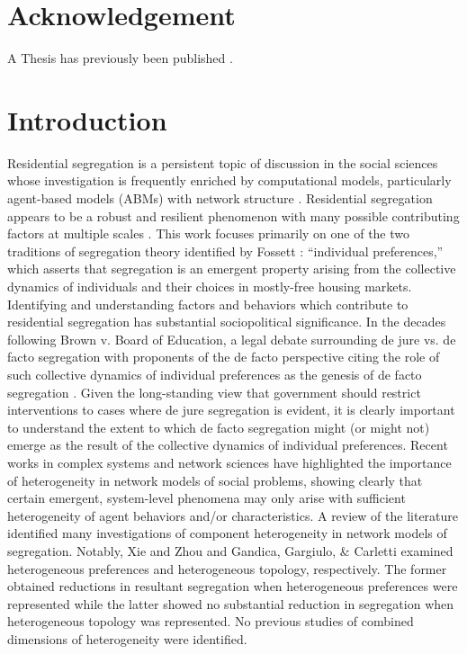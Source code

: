 \documentclass[a4paper]{article}
\begin{document}
\section{Acknowledgement}
A Thesis has previously been published \cite{DeterWill2023BaTH}.

\section{Introduction}
Residential segregation is a persistent topic of discussion in the social sciences whose investigation is frequently enriched by computational models, particularly agent-based models (ABMs) with network structure \cite{SakodaJamesM.1971Tcmo,schelling1971dynamic,xie2012modeling,gandica2016can,BRUCHElizabethE2006Ncan,clark2008understanding,ClarkW.A.V.1991RPaN,fossett2006ethnic,GargiuloFloriana2015UsfS,zhang2004dynamic,zhang2004residential,AbellaDavid2022AeiS,FagioloGiorgio2007Sin,GambettaDaniele2023Mcis,VinkovićDejan2006paot,MantzarisAlexanderV.2020Iamv}. Residential segregation appears to be a robust and resilient phenomenon with many possible contributing factors at multiple scales \cite{ClarkW.A.V.1991RPaN}.  This work focuses primarily on one of the two traditions of segregation theory identified by Fossett \cite{fossett2006ethnic}: “individual preferences,” which asserts that segregation is an emergent property arising from the collective dynamics of individuals and their choices in mostly-free housing markets. Identifying and understanding factors and behaviors which contribute to residential segregation has substantial sociopolitical significance.  In the decades following Brown v. Board of Education, a legal debate surrounding de jure vs. de facto segregation with proponents of the de facto perspective citing the role of such collective dynamics of individual preferences as the genesis of de facto segregation \cite{FrankenbergErica2018DFST}.  Given the long-standing view that government should restrict interventions to cases where de jure segregation is evident, it is clearly important to understand the extent to which de facto segregation might (or might not) emerge as the result of the collective dynamics of individual preferences.
Recent works in complex systems and network sciences \cite{sayama2020beyond,YamanoiJunichi2013Pcif,BullockSeth2023AHME,Sánchez-PuigFernanda2022Hec} have highlighted the importance of heterogeneity in network models of social problems, showing clearly that certain emergent, system-level phenomena may only arise with sufficient heterogeneity of agent behaviors and/or characteristics.  A review of the literature identified many investigations of component heterogeneity in network models of segregation.  Notably, Xie and Zhou \cite{xie2012modeling} and Gandica, Gargiulo, \& Carletti \cite{gandica2016can} examined heterogeneous preferences and heterogeneous topology, respectively. The former obtained reductions in resultant segregation when heterogeneous preferences were represented while the latter showed no substantial reduction in segregation when heterogeneous topology was represented. No previous studies of combined dimensions of heterogeneity were identified. 
\end{document}
